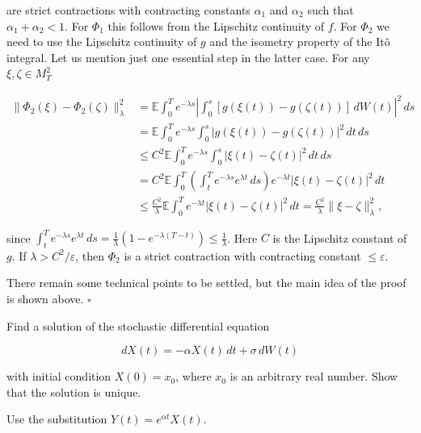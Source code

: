 \begin{Proof}[Outline]
are strict contractions with contracting constants $\alpha_1$ and $\alpha_2$ such that $\alpha_1 + \alpha_2 < 1$. For $\Phi_1$ this follows from the Lipschitz continuity of $f$. For $\Phi_2$ we need to use the Lipschitz continuity of $g$ and the isometry property of the Itô integral. Let us mention just one essential step in the latter case. For any $\xi, \zeta \in M_T^2$

\begin{align}
\|\Phi_2(\xi) - \Phi_2(\zeta)\|_{\lambda}^2 & = \mathbb{E} \int_0^T e^{-\lambda s} \left|\int_0^s [g(\xi(t)) - g(\zeta(t))] \, dW(t)\right|^2 \, ds \label{eq:Phi2_norm1} \\
& = \mathbb{E} \int_0^T e^{-\lambda s} \int_0^s |g(\xi(t)) - g(\zeta(t))|^2 \, dt \, ds \label{eq:Phi2_norm2} \\
& \leq C^2 \mathbb{E} \int_0^T e^{-\lambda s} \int_0^s |\xi(t) - \zeta(t)|^2 \, dt \, ds \label{eq:Phi2_norm3} \\
& = C^2 \mathbb{E} \int_0^T \left(\int_t^T e^{-\lambda s} e^{\lambda t} \, ds\right) e^{-\lambda t} |\xi(t) - \zeta(t)|^2 \, dt \label{eq:Phi2_norm4} \\
& \leq \frac{C^2}{\lambda} \mathbb{E} \int_0^T e^{-\lambda t} |\xi(t) - \zeta(t)|^2 \, dt = \frac{C^2}{\lambda} \|\xi - \zeta\|_{\lambda}^2, \label{eq:Phi2_norm5}
\end{align}

since $\int_t^T e^{-\lambda s} e^{\lambda t} \, ds = \frac{1}{\lambda}(1 - e^{-\lambda(T-t)}) \leq \frac{1}{\lambda}$. Here $C$ is the Lipschitz constant of $g$. If $\lambda > C^2 / \varepsilon$, then $\Phi_2$ is a strict contraction with contracting constant $\leq \varepsilon$.

There remain some technical points to be settled, but the main idea of the proof is shown above. \hfill $\square$
\end{Proof}

\begin{Exercise}
\label{ex:7.17}
Find a solution of the stochastic differential equation

\begin{equation}
dX(t) = -\alpha X(t) \, dt + \sigma \, dW(t)
\end{equation}

with initial condition $X(0) = x_0$, where $x_0$ is an arbitrary real number. Show that the solution is unique.

\begin{hint}
Use the substitution $Y(t) = e^{\alpha t} X(t)$.
\end{hint}
\end{Exercise}

